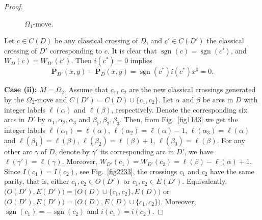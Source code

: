 \documentclass[10pt,a4paper]{amsart}
\numberwithin{equation}{section}
\numberwithin{equation}{section}
\begin{document}
\begin{proof}
\begin{figure}[!ht]
\begin{center}
			\caption{$\Omega_1$-move.} \label{fig1122}
		\end{center}
	\end{figure}
	
	Let $c\in C(D)$ be any classical crossing of $D$, and $c'\in C(D')$ the classical crossing of $D'$ corresponding to $c$. It is clear that $\operatorname{sgn}(c)=\operatorname{sgn}(c')$, and $W_D(c)=W_{D'}(c')$. Then $i(c^*)=0$ implies 
	$$
	\mathbf{P}_{D'}(x,y) - \mathbf{P}_D(x,y) = \operatorname{sgn}(c^*)i(c^*)x^0 =0.
	$$
	
	\noindent
	\textbf{Case (ii):} $M =\Omega_2$. Assume that $c_1$, $c_2$ are the new classical crossings generated by the $\Omega_2$-move and $C(D')=C(D)\cup \{c_1,c_2\}$. Let $\alpha$ and $\beta$ be arcs in $D$ with  integer labels $\ell(\alpha)$ and $\ell(\beta)$, respectively.  Denote the corresponding six arcs in $D'$ by $\alpha_1, \alpha_2, \alpha_3$ and $\beta_1, \beta_2, \beta_3$.  Then, from Fig.~\ref{fig1133} we get the integer labels $\ell(\alpha_1) = \ell(\alpha)$, $\ell(\alpha_2) = \ell(\alpha) - 1$, $\ell(\alpha_3) = \ell(\alpha)$ and $\ell(\beta_1) = \ell(\beta)$, $\ell(\beta_2) = \ell(\beta) + 1$, $\ell(\beta_3) = \ell(\beta)$. 
	For any other arc $\gamma$ of $D$, denote by $\gamma'$ its corresponding arc in $D'$, we have $\ell(\gamma') = \ell(\gamma)$. Moreover, $W_{D'}(c_1)=W_{D'}(c_2)=\ell(\beta)-\ell(\alpha)+1$. Since $I(c_1)=I(c_2)$, see Fig.~\ref{fig2233}, the crossings $c_1$ and $c_2$ have the same parity, that is, either $c_1, c_2 \in O(D')$ or $c_1, c_2 \in E(D')$. Equivalently, $\bigl(O(D'), E(D')\bigr) = \bigl(O(D) \cup \{c_1, c_2\}, E(D)\bigr)$ or $\bigl(O(D'), E(D')\bigr) = \bigl(O(D), E(D) \cup \{c_1, c_2\}\bigr)$. Moreover, $\operatorname{sgn}(c_1)=- \operatorname{sgn}(c_2)$ and $i(c_1)=i(c_2)$.
	

\end{proof}
\end{document}
